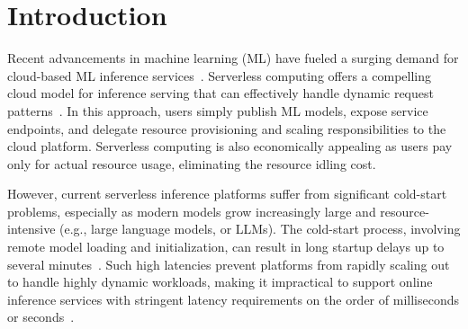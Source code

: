 \section{Introduction}
\label{sec:intro}



Recent advancements in machine learning (ML) have fueled a surging demand for cloud-based ML inference
services~\cite{zhang_shepherd_nodate,zhang_mark:_2019,shen_nexus_2019,choi_serving_2022,gujarati_serving_2020}. Serverless computing offers a compelling cloud model for inference
serving that can effectively handle dynamic request patterns~\cite{ali_fc,yang_infless_2022, yu_gillis_icdcs, ali_batch_nodate}. 
In this approach, users simply publish ML models, expose service endpoints, and delegate resource provisioning and scaling responsibilities to the cloud platform. 
Serverless computing is also economically appealing as users pay only for actual resource usage, eliminating the resource idling cost.



However, current serverless inference platforms suffer from significant cold-start problems, especially as modern models grow increasingly large and resource-intensive (e.g., large language models, or LLMs).
The cold-start process, involving remote model loading and initialization, can result in long startup delays up to several minutes~\cite{fu_serverlessllm_2024}. 
Such high latencies prevent platforms from rapidly scaling out 
to handle highly dynamic workloads, making it impractical to support online inference services with stringent latency requirements on the order of milliseconds or seconds~\cite{fu_serverlessllm_2024,zhang_mark:_2019,zhong_distserve_2024,agrawal_taming_2024}.

